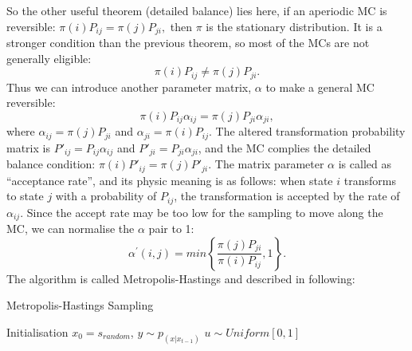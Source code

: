 \documentclass[11pt,twoside,a4paper]{article}
\begin{document}
	So the other useful theorem (detailed balance) lies here, if an aperiodic MC is reversible: $\pi (i) P_{ij} = \pi (j) P_{ji},$ then $ \pi $ is the stationary distribution.
	It is a stronger condition than the previous theorem, so most of the MCs are not generally eligible:
	\begin{equation}
	\pi (i) P_{ij} \neq \pi (j) P_{ji}.
	\end{equation}
	Thus we can introduce another parameter matrix, $ \alpha $ to make a general MC reversible:
	\begin{equation}
	\pi (i) P_{ij} \alpha_{ij} = \pi (j) P_{ji} \alpha_{ji}	,
	\end{equation}
	where $ \alpha_{ij} = \pi(j) P_{ji} $ and $ \alpha_{ji} = \pi(i) P_{ij}$.
	The altered transformation probability matrix is $ P'_{ij} =  P_{ij} \alpha_{ij}$ and $ P'_{ji} =  P_{ji} \alpha_{ji}$, and the MC complies the detailed balance condition: $\pi (i) P'_{ij} = \pi (j) P'_{ji}$.
	The matrix parameter $ \alpha $ is called as ``acceptance rate'', and its physic meaning is as follows: when state $ i $ transforms to state $ j $ with a probability of $ P_{ij} $, the transformation is accepted by the rate of $ \alpha_{ij} $.
	Since the accept rate may be too low for the sampling to move along the MC, we can normalise the $ \alpha $ pair to 1:
	\begin{equation}
		\alpha^{'}(i,j) = min \left\{\frac{\pi(j)P_{ji}}{\pi(i)P_{ij}},1\right\}.
	\end{equation}
	The algorithm is called Metropolis-Hastings and described in following:
	\begin{algorithm}[h]
	  \caption{Metropolis-Hastings Sampling}
	  \label{alg:mcmc}
	  \begin{algorithmic}
	  	
	    \State Initialisation $x_0 = s_{random}$, 
		    \State $y \sim p_(x|x_{t-1})$ 
		    \State $ u \sim Uniform[0,1] $ 
				 
				\Else {}  
			\EndIf
		\EndFor
	  \end{algorithmic}
	\end{algorithm}
\end{document}
